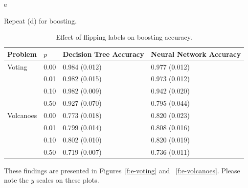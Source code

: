 \documentclass[fleqn]{homework}
\begin{document}
    \FloatBarrier
  \begin{problem}{e}
    \begin{question}
      Repeat (d) for boosting.
    \end{question}
    \FloatBarrier

    \begin{table}[h]
      \centering
      \caption{Effect of flipping labels on boosting accuracy.}
      \label{t:e}
      \begin{tabular}{ll|ll}
        \toprule
        Problem   & $p$        & Decision Tree Accuracy & Neural Network Accuracy \\
        \midrule
        Voting    & 0.00       & 0.984 (0.012)          & 0.977 (0.012)            \\
                  & 0.01       & 0.982 (0.015)          & 0.973 (0.012)            \\
                  & 0.10       & 0.982 (0.009)          & 0.942 (0.020)            \\
                  & 0.50       & 0.927 (0.070)          & 0.795 (0.044)            \\
        \midrule
        Volcanoes & 0.00       & 0.773 (0.018)          & 0.820 (0.023)            \\
                  & 0.01       & 0.799 (0.014)          & 0.808 (0.016)            \\
                  & 0.10       & 0.802 (0.010)          & 0.820 (0.019)            \\
                  & 0.50       & 0.719 (0.007)          & 0.736 (0.011)            \\
        \bottomrule
      \end{tabular}
    \end{table}

    These findings are presented in Figures~\ref{f:e-voting} and
    ~\ref{f:e-volcanoes}.  Please note the $y$ scales on these plots.


\end{problem}
\end{document}
